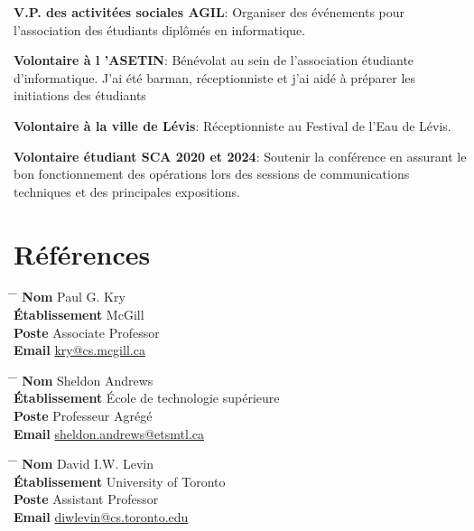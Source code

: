 \documentclass[10pt]{article} %
\begin{document}
\noindent\textbf{V.P. des activitées sociales AGIL}: Organiser des événements pour l'association des étudiants diplômés en informatique.

\noindent\textbf{Volontaire à l 'ASETIN}: Bénévolat au sein de l'association étudiante d'informatique. J'ai été barman, réceptionniste et j'ai
aidé à préparer les initiations des étudiants

\noindent\textbf{Volontaire à la ville de Lévis}: Réceptionniste au Festival de l'Eau de Lévis.

\noindent\textbf{Volontaire étudiant SCA 2020 et 2024}: Soutenir la conférence en assurant le bon fonctionnement des opérations lors des
sessions de communications techniques et des principales expositions.

\section{Références}

\parbox{0.5\textwidth}{
\begin{tabbing}
\hspace{2.75cm} \= \hspace{4cm} \= \kill
{\bf Nom} \> Paul G. Kry\\ 
{\bf Établissement} \> McGill\\ 
{\bf Poste} \> Associate Professor \\ 
{\bf Email} \> \href{mailto:kry@cs.mcgill.ca}{kry@cs.mcgill.ca}
\end{tabbing}}

\noindent\parbox{0.5\textwidth}{
\begin{tabbing}
\hspace{2.75cm} \= \hspace{4cm} \= \kill
{\bf Nom} \> Sheldon Andrews\\ 
{\bf Établissement} \> École de technologie supérieure\\ 
{\bf Poste} \>  Professeur Agrégé \\ 
{\bf Email} \> \href{mailto:sheldon.andrews@etsmtl.ca}{sheldon.andrews@etsmtl.ca}
\end{tabbing}}

\noindent\parbox{0.5\textwidth}{
\begin{tabbing}
\hspace{2.75cm} \= \hspace{4cm} \= \kill
{\bf Nom} \> David I.W. Levin\\ 
{\bf Établissement} \> University of Toronto\\ 
{\bf Poste} \>Assistant Professor \\ 
{\bf Email} \> \href{mailto:diwlevin@cs.toronto.edu}{diwlevin@cs.toronto.edu}
\end{tabbing}}


\end{document}
